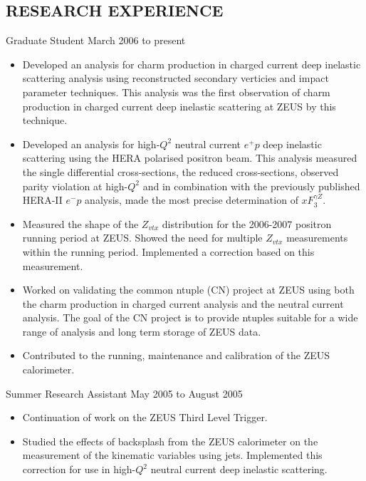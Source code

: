 \documentclass[margin]{res}
\begin{document}
\begin{resume}
\section{RESEARCH EXPERIENCE}

Graduate Student \hfill March 2006 to present\\

\begin{itemize}
\item Developed an analysis for charm production in charged current deep inelastic scattering analysis using reconstructed secondary verticies and impact parameter techniques.  This analysis was the first observation of charm production in charged current deep inelastic scattering at ZEUS by this technique.
\item Developed an analysis for high-$Q^2$ neutral current $e^{+}p $ deep inelastic scattering using the HERA polarised positron beam.  This analysis measured the single differential cross-sections, the reduced cross-sections, observed parity violation at high-$Q^2$ and in combination with the previously published HERA-II $e^{-}p$ analysis, made the most precise determination of $xF_3^{\gamma Z}$.  
\item Measured the shape of the $Z_{vtx}$ distribution for the 2006-2007 positron running period at ZEUS.  Showed the need for multiple $Z_{vtx}$ measurements within the running period.  Implemented a correction based on this measurement.
\item Worked on validating the common ntuple (CN) project at ZEUS  using both the charm production in charged current analysis and the neutral current analysis.  The goal of the CN project is to provide ntuples suitable for a wide range of analysis and long term storage of ZEUS data.
\item Contributed to the running, maintenance and calibration of the ZEUS calorimeter. 

\end{itemize}

Summer Research Assistant \hfill May 2005 to August 2005\\

\begin{itemize}
  \item Continuation of work on the ZEUS Third Level Trigger.
  \item Studied the effects of backsplash from the ZEUS calorimeter on the measurement of the kinematic variables using jets.  Implemented this correction for use in high-$Q^2$ neutral current deep inelastic scattering.
\end{itemize}


\end{resume}
\end{document}
